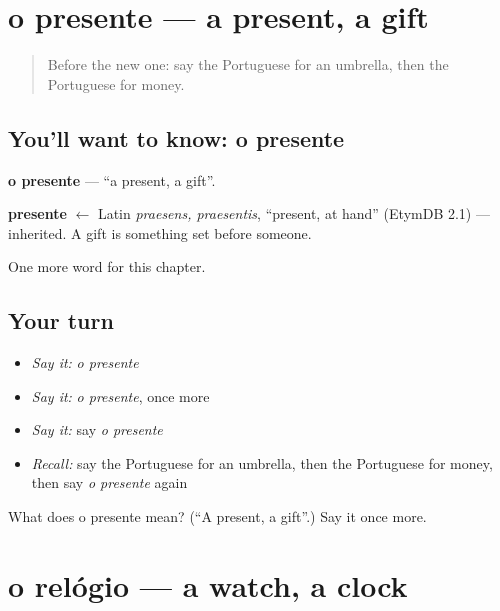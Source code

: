 \section[o presente]{o presente — a present, a gift}

\label{lesson:PT-C53-presente}



\begin{quote}
Before the new one: say the Portuguese for an umbrella, then the Portuguese for money.
\end{quote}

\subsection*{You'll want to know: o presente}
\textbf{o presente} — \textquotedblleft{}a present, a gift\textquotedblright{}.

\begin{cousinweb}
\textbf{presente} $\leftarrow$ Latin \emph{praesens, praesentis}, \textquotedblleft{}present, at hand\textquotedblright{} (EtymDB 2.1) — inherited. A gift is something set before someone.
\end{cousinweb}

\begin{grammarlens}[title={What you've built}]
One more word for this chapter.
\end{grammarlens}

\subsection*{Your turn}
\begin{itemize}
\raggedright
  \item \emph{Say it:} \emph{o presente}
  \item \emph{Say it:} \emph{o presente}, once more
  \item \emph{Say it:} say \emph{o presente}
  \item \emph{Recall:} say the Portuguese for an umbrella, then the Portuguese for money, then say \emph{o presente} again
\end{itemize}

\begin{tcolorbox}[breakable,colback=teal!4,colframe=teal!35!black,title={Before you move on}]
What does o presente mean? (\textquotedblleft{}A present, a gift\textquotedblright{}.) Say it once more.
\end{tcolorbox}
\section[o relógio]{o relógio — a watch, a clock}

